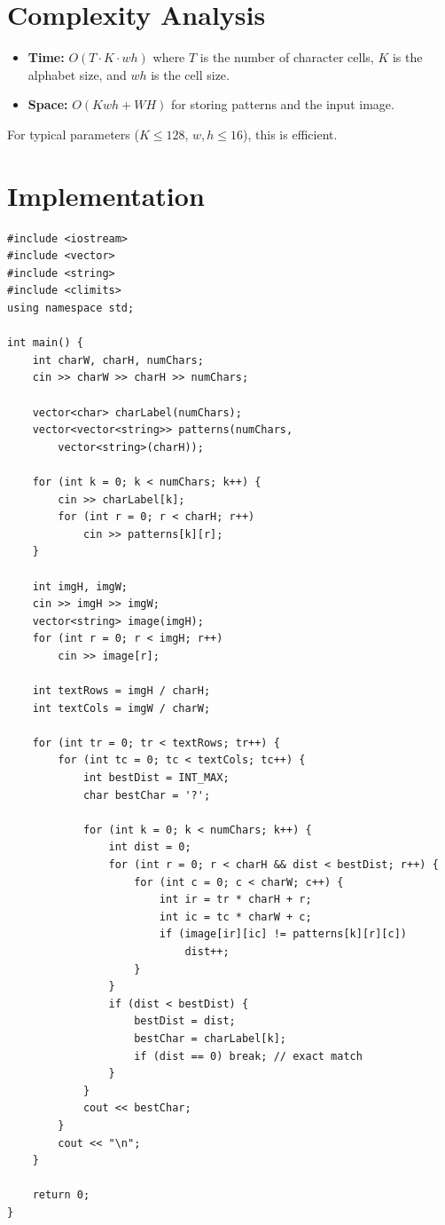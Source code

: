 \documentclass[11pt,a4paper]{article}
\begin{document}
\section{Complexity Analysis}

\begin{itemize}
  \item \textbf{Time:} $O(T \cdot K \cdot wh)$ where $T$ is the number of
    character cells, $K$ is the alphabet size, and $wh$ is the cell size.
  \item \textbf{Space:} $O(Kwh + WH)$ for storing patterns and the input
    image.
\end{itemize}

For typical parameters ($K \le 128$, $w, h \le 16$), this is efficient.

\section{Implementation}

\begin{lstlisting}
#include <iostream>
#include <vector>
#include <string>
#include <climits>
using namespace std;

int main() {
    int charW, charH, numChars;
    cin >> charW >> charH >> numChars;

    vector<char> charLabel(numChars);
    vector<vector<string>> patterns(numChars,
        vector<string>(charH));

    for (int k = 0; k < numChars; k++) {
        cin >> charLabel[k];
        for (int r = 0; r < charH; r++)
            cin >> patterns[k][r];
    }

    int imgH, imgW;
    cin >> imgH >> imgW;
    vector<string> image(imgH);
    for (int r = 0; r < imgH; r++)
        cin >> image[r];

    int textRows = imgH / charH;
    int textCols = imgW / charW;

    for (int tr = 0; tr < textRows; tr++) {
        for (int tc = 0; tc < textCols; tc++) {
            int bestDist = INT_MAX;
            char bestChar = '?';

            for (int k = 0; k < numChars; k++) {
                int dist = 0;
                for (int r = 0; r < charH && dist < bestDist; r++) {
                    for (int c = 0; c < charW; c++) {
                        int ir = tr * charH + r;
                        int ic = tc * charW + c;
                        if (image[ir][ic] != patterns[k][r][c])
                            dist++;
                    }
                }
                if (dist < bestDist) {
                    bestDist = dist;
                    bestChar = charLabel[k];
                    if (dist == 0) break; // exact match
                }
            }
            cout << bestChar;
        }
        cout << "\n";
    }

    return 0;
}
\end{lstlisting}
\end{document}
